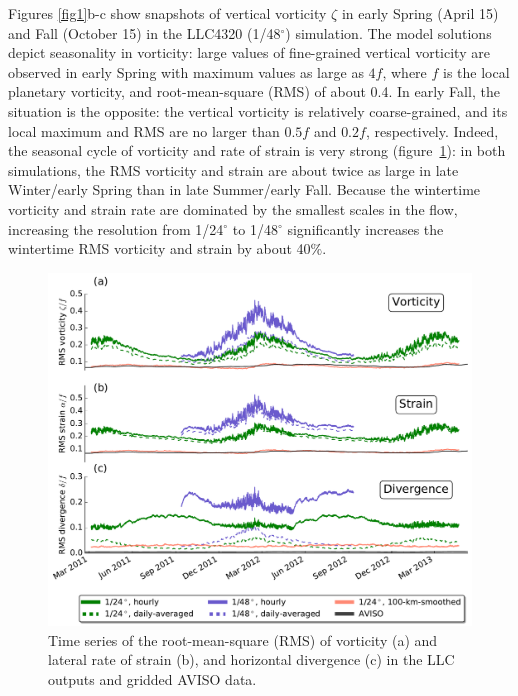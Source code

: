 \documentclass[grl]{agutex2015}
\begin{document}
\begin{article}
Figures \ref{fig1}b-c show snapshots of vertical vorticity $\zeta$ in early Spring
(April 15) and Fall (October 15) in the LLC4320 (1/48$^\circ$) simulation.
The model solutions depict seasonality in vorticity: large values of
fine-grained vertical vorticity are observed in early Spring with maximum
values as large as $4f$, where $f$ is
the local planetary vorticity, and root-mean-square (RMS) of about 0.4. In early
Fall, the situation is the opposite: the vertical vorticity is relatively coarse-grained,
and its local maximum and RMS are no larger than $0.5f$ and $0.2f$, respectively.
Indeed, the seasonal cycle of vorticity and rate of strain is very strong (figure~\ref{fig2}):
in both simulations, the RMS vorticity and strain are about twice as large in
late Winter/early Spring
than in late Summer/early Fall. Because the wintertime vorticity and strain rate
are dominated by the smallest scales in the flow, increasing the resolution from
1/24$^\circ$ to 1/48$^\circ$ significantly increases the wintertime RMS vorticity
and strain by about 40$\%$.


 \begin{figure}[ht]
   \begin{center}
     \includegraphics[width=.65\textwidth]{figs/fig2.pdf}
  \caption{Time series of the root-mean-square (RMS) of vorticity (a) and
  lateral rate of strain (b), and horizontal divergence (c) in the LLC outputs and gridded AVISO data.}
  \label{fig2}
  \end{center}
\end{figure}


\end{article}
\end{document}
